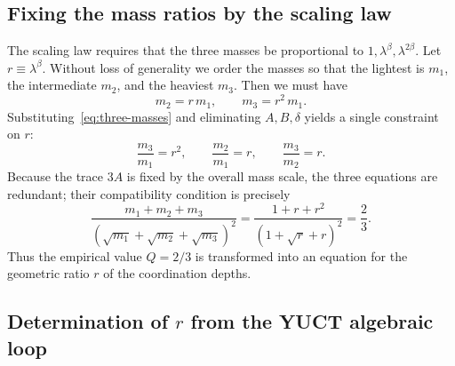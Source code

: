 \documentclass[12pt,a4paper]{article}
\begin{document}
\subsection{Fixing the mass ratios by the scaling law}

The scaling law requires that the three masses be proportional to
$1, \lambda^{\beta}, \lambda^{2\beta}$.  Let $r \equiv \lambda^{\beta}$.
Without loss of generality we order the masses so that the lightest is
$m_1$, the intermediate $m_2$, and the heaviest $m_3$.  Then we must have
\begin{equation}
	m_2 = r\, m_1, \qquad m_3 = r^2\, m_1 .
\end{equation}
Substituting~\eqref{eq:three-masses} and eliminating $A,B,\delta$ yields a
single constraint on $r$:
\begin{equation}
	\frac{m_3}{m_1} = r^2, \qquad
	\frac{m_2}{m_1} = r, \qquad
	\frac{m_3}{m_2} = r .
\end{equation}
Because the trace $3A$ is fixed by the overall mass scale, the three equations
are redundant; their compatibility condition is precisely
\begin{equation}
	\frac{m_1 + m_2 + m_3}{(\sqrt{m_1}+\sqrt{m_2}+\sqrt{m_3})^2}
	= \frac{1 + r + r^2}{(1 + \sqrt{r} + r)^2} = \frac{2}{3}.
	\label{eq:Qr}
\end{equation}
Thus the empirical value $Q=2/3$ is transformed into an equation for the
geometric ratio $r$ of the coordination depths.

\subsection{Determination of $r$ from the YUCT algebraic loop}
\end{document}
